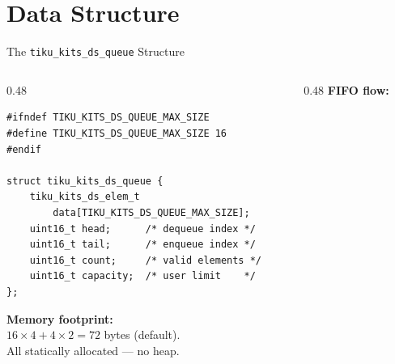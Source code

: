 \documentclass[aspectratio=169, 10pt]{beamer}
\begin{document}
\section{Data Structure}

\begin{frame}[fragile]{The \texttt{tiku\_kits\_ds\_queue} Structure}
\begin{columns}[T]
\begin{column}{0.48\textwidth}
\begin{lstlisting}[style=cstyle,
  title={ds/queue/tiku\_kits\_ds\_queue.h}]
#ifndef TIKU_KITS_DS_QUEUE_MAX_SIZE
#define TIKU_KITS_DS_QUEUE_MAX_SIZE 16
#endif

struct tiku_kits_ds_queue {
    tiku_kits_ds_elem_t
        data[TIKU_KITS_DS_QUEUE_MAX_SIZE];
    uint16_t head;      /* dequeue index */
    uint16_t tail;      /* enqueue index */
    uint16_t count;     /* valid elements */
    uint16_t capacity;  /* user limit    */
};
\end{lstlisting}

\vspace{0.3em}
\textbf{Memory footprint:}\\
$16 \times 4 + 4 \times 2 = 72$ bytes (default).\\
All statically allocated --- no heap.
\end{column}

\begin{column}{0.48\textwidth}
\textbf{FIFO flow:}
\begin{center}
\end{center}


\end{column}
\end{columns}
\end{frame}
\end{document}
